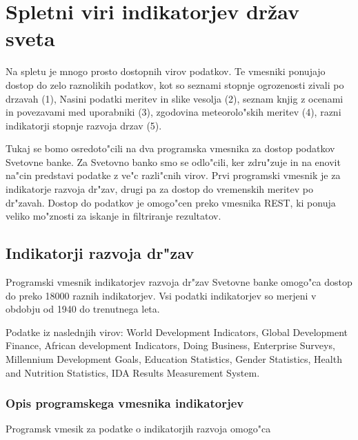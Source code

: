 \chapter{Spletni viri indikatorjev držav sveta}

Na spletu je mnogo prosto dostopnih virov podatkov. Te vmesniki ponujajo dostop
do zelo raznolikih podatkov, kot so seznami stopnje ogrozenosti zivali po
drzavah (1), Nasini podatki meritev in slike vesolja (2), seznam knjig z 
ocenami in povezavami med uporabniki (3), zgodovina meteorolo"skih meritev (4),
razni indikatorji stopnje razvoja drzav (5).



% 
% 
% 
% 




Tukaj se bomo osredoto"cili
na dva programska vmesnika za dostop podatkov Svetovne banke. Za Svetovno banko
smo se odlo"cili, ker zdru"zuje in na enovit na"cin predstavi podatke z ve"c
razli"cnih virov. Prvi programski vmesnik je za indikatorje razvoja dr"zav,
drugi pa za dostop do vremenskih meritev po dr"zavah. Dostop do podatkov je
omogo"cen preko vmesnika REST, ki ponuja veliko mo"znosti za iskanje in
filtriranje rezultatov.


\section{Indikatorji razvoja dr"zav}

Programski vmesnik indikatorjev razvoja dr"zav Svetovne banke omogo"ca dostop
do preko 18000 raznih indikatorjev. Vsi podatki indikatorjev so merjeni v
obdobju od 1940 do trenutnega leta. 

Podatke iz naslednjih virov:
World Development Indicators, 
Global Development Finance, 
African development Indicators, 
Doing Business,
Enterprise Surveys, 
Millennium Development Goals, 
Education Statistics, 
Gender Statistics,
Health and Nutrition Statistics, 
IDA Results Measurement System.


\subsection{Opis programskega vmesnika indikatorjev}


Programsk vmesik za podatke o indikatorjih razvoja omogo"ca 


